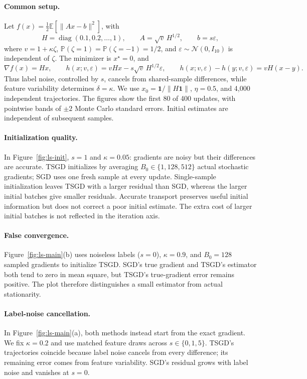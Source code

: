 \paragraph{Common setup.}
Let $f(x)=\tfrac12\mathbb E[\|Ax-b\|^2]$, with
\[
H=\operatorname{diag}(0.1,0.2,\ldots,1),\qquad
A=\sqrt v\,H^{1/2},\qquad b=s\varepsilon,
\]
where $v=1+\kappa\zeta$, $\mathbb P(\zeta=1)=\mathbb P(\zeta=-1)=1/2$,
and $\varepsilon\sim\mathcal N(0,I_{10})$ is independent of $\zeta$.
The minimizer is $x^\star=0$, and
\[
\nabla f(x)=Hx,\qquad
h(x;v,\varepsilon)=vHx-s\sqrt v\,H^{1/2}\varepsilon,\qquad
h(x;v,\varepsilon)-h(y;v,\varepsilon)=vH(x-y).
\]
Thus label noise, controlled by $s$, cancels from shared-sample
differences, while feature variability determines $\delta=\kappa$.
We use $x_0=\boldsymbol 1/\|H\boldsymbol 1\|$,
$\eta=0.5$, and 4,000 independent trajectories.
The figures show the first 80 of 400 updates, with pointwise bands
of $\pm2$ Monte Carlo standard errors.
Initial estimates are independent of subsequent samples.

\paragraph{Initialization quality.}
In Figure~\ref{fig:ls-init}, $s=1$ and $\kappa=0.05$:
gradients are noisy but their differences are accurate.
TSGD initializes by averaging $B_0\in\{1,128,512\}$ actual stochastic
gradients; SGD uses one fresh sample at every update.
Single-sample initialization leaves TSGD with a larger residual than
SGD, whereas the larger initial batches give smaller residuals.
Accurate transport preserves useful initial information but does not
correct a poor initial estimate. The extra cost of larger initial
batches is not reflected in the iteration axis.

\paragraph{False convergence.}
Figure~\ref{fig:ls-main}(b) uses noiseless labels ($s=0$),
$\kappa=0.9$, and $B_0=128$ sampled gradients to initialize TSGD.
SGD's true gradient and TSGD's estimator both tend to zero in mean
square, but TSGD's true-gradient error remains positive.
The plot therefore distinguishes a small estimator from actual
stationarity.

\paragraph{Label-noise cancellation.}
In Figure~\ref{fig:ls-main}(a), both methods instead start from the
exact gradient. We fix $\kappa=0.2$ and use matched feature draws
across $s\in\{0,1,5\}$. TSGD's trajectories coincide because label noise
cancels from every difference; its remaining error comes from feature
variability. SGD's residual grows with label noise and vanishes at $s=0$.

